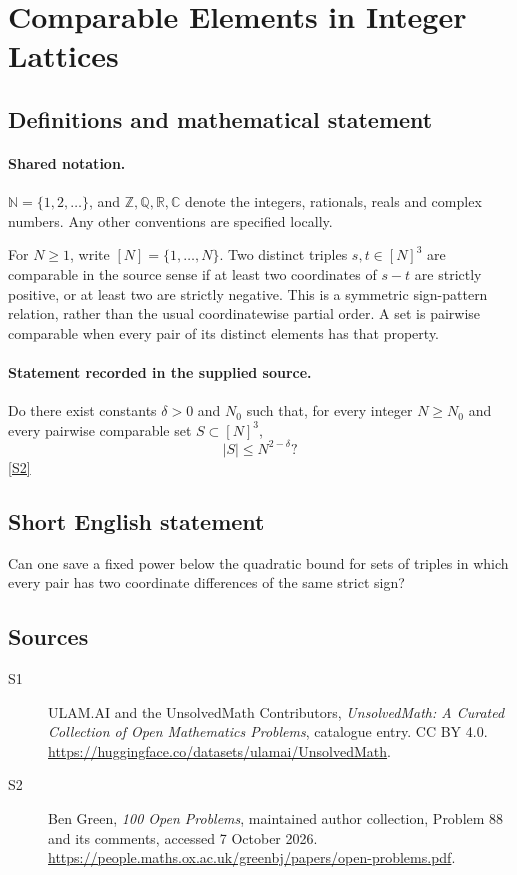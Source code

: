 \documentclass[11pt]{article}
\newcommand{\sref}[2]{\hyperlink{source:#1:#2}{[S#2]}}
\begin{document}
\section{Comparable Elements in Integer Lattices}\label{statement}

\subsection{Definitions and mathematical statement}

\paragraph{Shared notation.}$\mathbb N=\{1,2,\ldots\}$, and $\mathbb Z,\mathbb Q,\mathbb R,\mathbb C$ denote the integers, rationals, reals and complex numbers. Any other conventions are specified locally.


For $N\geq1$, write $[N]=\{1,\ldots,N\}$. Two distinct triples $s,t\in[N]^3$ are comparable in the source sense if at least two coordinates of $s-t$ are strictly positive, or at least two are strictly negative. This is a symmetric sign-pattern relation, rather than the usual coordinatewise partial order. A set is pairwise comparable when every pair of its distinct elements has that property.
\paragraph{Statement recorded in the supplied source.}
Do there exist constants $\delta>0$ and $N_0$ such that, for every integer $N\geq N_0$ and every pairwise comparable set $S\subset[N]^3$,
\[
 |S|\leq N^{2-\delta}?
\] \sref{statement}{2}
\subsection{Short English statement}
Can one save a fixed power below the quadratic bound for sets of triples in which every pair has two coordinate differences of the same strict sign?
\subsection{Sources}
\begin{description}
\item[\hypertarget{source:statement:1}{S1}] ULAM.AI and the UnsolvedMath Contributors, \emph{UnsolvedMath: A Curated Collection of Open Mathematics Problems}, catalogue entry. CC BY 4.0. \url{https://huggingface.co/datasets/ulamai/UnsolvedMath}.
\item[\hypertarget{source:statement:2}{S2}] Ben Green, \emph{100 Open Problems}, maintained author collection, Problem 88 and its comments, accessed 7 October 2026. \url{https://people.maths.ox.ac.uk/greenbj/papers/open-problems.pdf}.
\end{description}
\label{end:statement}
\end{document}
